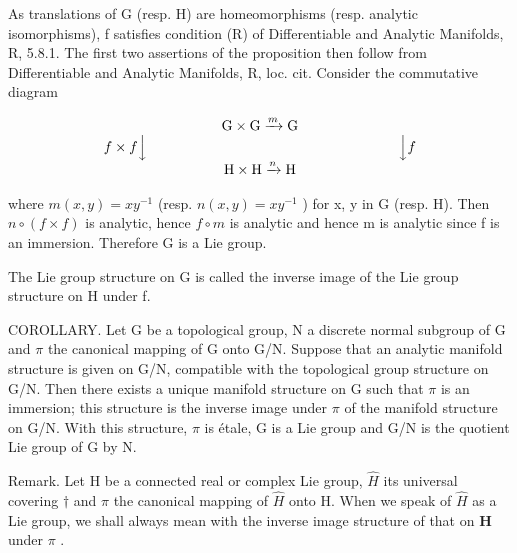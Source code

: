 As translations of G (resp. H) are homeomorphisms (resp. analytic isomorphisms), f satisfies condition (R) of Differentiable and Analytic Manifolds, R, 5.8.1. The first two assertions of the proposition then follow from Differentiable and Analytic Manifolds, R, loc. cit. Consider the commutative diagram

\[
\begin{array}{c} \mathrm{G} \times \mathrm{G} \xrightarrow {m} \mathrm{G} \\ f \times f \Big \downarrow \qquad \qquad \qquad \qquad \qquad \qquad \qquad \qquad \qquad \Big \downarrow f \\ \mathrm{H} \times \mathrm{H} \xrightarrow {n} \mathrm{H} \end{array}
\]

where \(m(x,y)=xy^{-1}\) (resp. \(n(x,y)=xy^{-1}\) ) for x, y in G (resp. H). Then \(n\circ(f\times f)\) is analytic, hence \(f\circ m\) is analytic and hence m is analytic since f is an immersion. Therefore G is a Lie group.

The Lie group structure on G is called the inverse image of the Lie group structure on H under f.

COROLLARY. Let G be a topological group, N a discrete normal subgroup of G and \(\pi\) the canonical mapping of G onto G/N. Suppose that an analytic manifold structure is given on G/N, compatible with the topological group structure on G/N. Then there exists a unique manifold structure on G such that \(\pi\) is an immersion; this structure is the inverse image under \(\pi\) of the manifold structure on G/N. With this structure, \(\pi\) is étale, G is a Lie group and G/N is the quotient Lie group of G by N.

Remark. Let H be a connected real or complex Lie group, \(\hat{H}\) its universal covering \(\dagger\) and \(\pi\) the canonical mapping of \(\hat{H}\) onto H. When we speak of \(\hat{H}\) as a Lie group, we shall always mean with the inverse image structure of that on \(\mathbf{H}\) under \(\pi\) .

